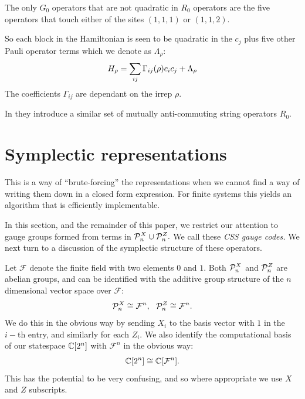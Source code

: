 \documentclass[12pt]{article}
\newcommand{\Field}{\mathcal{F}}
\def\Im{\mathrm{im}}
\def\Ker{\mathrm{ker}}
\begin{document}
The only $G_0$ operators that are not 
quadratic in $R_0$ operators are the five
operators that touch either of the sites
$(1,1,1)$ or $(1,1,2)$.

So each block in the Hamiltonian
is seen to be quadratic in the $c_j$ plus
five other Pauli operator terms which we denote as $\Lambda_\rho$:
$$
    H_\rho = \sum_{ij} \Gamma_{ij}(\rho) c_i c_j + \Lambda_\rho
$$
The coefficients $\Gamma_{ij}$ are dependant on the irrep $\rho.$

In \cite{Kells2009} they introduce a similar set of
mutually anti-commuting string operators $R_0.$

%

\def\Cn{\Complex[2^n]}
\def\Cr{\Complex[2^r]}
\def\Fn{\Field^n}
\def\Fm{\Field^m}
\def\Fr{\Field^r}
\def\Fnd{\Field_{n}}
\def\Fmd{\Field_{m}}
\def\Frd{\Field_{r}}

\def\Span#1{\langle #1 \rangle}

\section{Symplectic representations}

This is a way of ``brute-forcing'' the representations when
we cannot find a way of writing them down in a closed form expression.
For finite systems this yields an algorithm that is efficiently implementable.

In this section, and the remainder of this paper,
we restrict our
attention to gauge groups formed from terms 
in $\mathcal{P}_n^X\cup\mathcal{P}_n^Z.$
We call these \emph{CSS gauge codes.}
We next turn to a discussion of the symplectic structure of
these operators.

Let $\Field$ denote the finite field with two elements $0$ and $1$.
Both $\mathcal{P}^X_n$ and $\mathcal{P}^Z_n$ are abelian groups,
and can be identified with the additive 
group structure of the $n$ dimensional vector space
over $\Field:$
$$
    \Pauli^X_n \cong \Fn,  \ \ 
    \Pauli^Z_n \cong \Fn. 
$$
We do this in the obvious way by sending $X_i$ to the basis vector with
$1$ in the $i-$th entry, and similarly for each $Z_i$. 
We also identify the computational basis of our statespace $\mathbb{C}[2^n]$
with $\Fn$ in the obvious way:
$$
\Complex[2^n] \cong \Complex[\Fn].
$$
This has the potential to be very confusing, and
so where appropriate we use $X$ and $Z$ subscripts.
\end{document}
